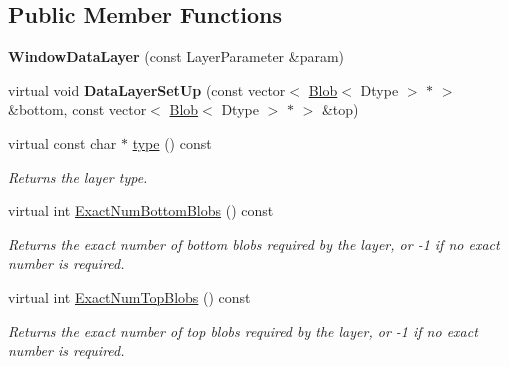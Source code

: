 \subsection*{Public Member Functions}
\begin{DoxyCompactItemize}
\item 
{\bfseries Window\+Data\+Layer} (const Layer\+Parameter \&param)\hypertarget{classcaffe_1_1WindowDataLayer_a747fce6a6cfc2bcc05f9422d8b1cba97}{}\label{classcaffe_1_1WindowDataLayer_a747fce6a6cfc2bcc05f9422d8b1cba97}

\item 
virtual void {\bfseries Data\+Layer\+Set\+Up} (const vector$<$ \hyperlink{classcaffe_1_1Blob}{Blob}$<$ Dtype $>$ $\ast$ $>$ \&bottom, const vector$<$ \hyperlink{classcaffe_1_1Blob}{Blob}$<$ Dtype $>$ $\ast$ $>$ \&top)\hypertarget{classcaffe_1_1WindowDataLayer_ac1956556924ed1323441bddc5bae8bf9}{}\label{classcaffe_1_1WindowDataLayer_ac1956556924ed1323441bddc5bae8bf9}

\item 
virtual const char $\ast$ \hyperlink{classcaffe_1_1WindowDataLayer_a60fad9f57a13e19faa128a0fd07cb84c}{type} () const \hypertarget{classcaffe_1_1WindowDataLayer_a60fad9f57a13e19faa128a0fd07cb84c}{}\label{classcaffe_1_1WindowDataLayer_a60fad9f57a13e19faa128a0fd07cb84c}

\begin{DoxyCompactList}\small\item\em Returns the layer type. \end{DoxyCompactList}\item 
virtual int \hyperlink{classcaffe_1_1WindowDataLayer_ac6c818494dd8d3636523556c858908c4}{Exact\+Num\+Bottom\+Blobs} () const 
\begin{DoxyCompactList}\small\item\em Returns the exact number of bottom blobs required by the layer, or -\/1 if no exact number is required. \end{DoxyCompactList}\item 
virtual int \hyperlink{classcaffe_1_1WindowDataLayer_ae322bcc85f1d1ac2dc59e1ff28c29e7a}{Exact\+Num\+Top\+Blobs} () const 
\begin{DoxyCompactList}\small\item\em Returns the exact number of top blobs required by the layer, or -\/1 if no exact number is required. \end{DoxyCompactList}\end{DoxyCompactItemize}

